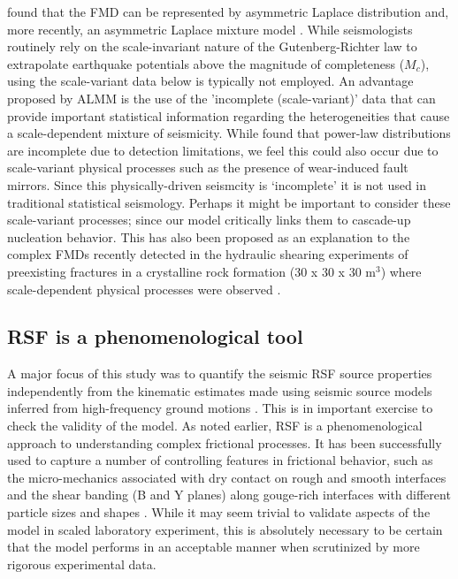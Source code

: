 \documentclass[preprint,1p, 10pt,authoryear]{elsarticle}
\begin{document}
\citet{Mignan2012} found that the FMD can be represented by asymmetric Laplace distribution and, more recently, an asymmetric Laplace mixture model \citep[ALMM, ][]{Mignan2020}. While seismologists routinely rely on the scale-invariant nature of the Gutenberg-Richter law to extrapolate earthquake potentials above the magnitude of completeness ($M_{c}$), using the scale-variant data below is typically not employed. An advantage proposed by ALMM is the use of the 'incomplete (scale-variant)' data that can provide important statistical information regarding the heterogeneities that cause a scale-dependent mixture of seismicity. While \citet{Mignan2020} found that power-law distributions are incomplete due to detection limitations, we feel this could also occur due to scale-variant physical processes such as the presence of wear-induced fault mirrors. Since this physically-driven seismcity is `incomplete' it is not used in traditional statistical seismology. Perhaps it might be important to consider these scale-variant processes; since our model critically links them to cascade-up nucleation behavior. This has also been proposed as an explanation to the complex FMDs recently detected in the hydraulic shearing experiments of preexisting fractures in a crystalline rock formation (30 x 30 x 30 m$^{3}$) where scale-dependent physical processes were observed \citep{Villiger2019}.

\subsection{RSF is a phenomenological tool}
A major focus of this study was to quantify the seismic RSF source properties independently from the kinematic estimates made using seismic source models inferred from high-frequency ground motions \citep{Selvadurai2019}. This is in important exercise to check the validity of the model. As noted earlier, RSF is a phenomenological approach to understanding complex frictional processes.  It has been successfully used to capture a number of controlling features in frictional behavior, such as the micro-mechanics associated with dry contact on rough and smooth interfaces \citep{Marone1998,Yoshioka1997} and the shear banding (B and Y planes) along gouge-rich interfaces with different particle sizes and shapes \citep{Marone1993, Anthony2005,Scuderi2017}. While it may seem trivial to validate aspects of the model in scaled laboratory experiment, this is absolutely necessary to be certain that the model performs in an acceptable manner when scrutinized by more rigorous experimental data.
\end{document}
